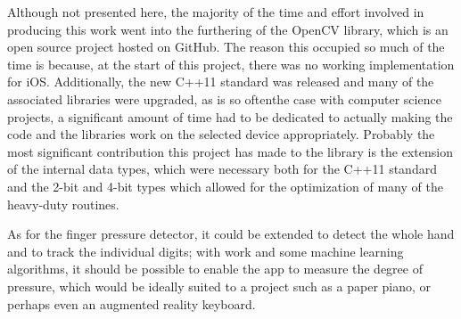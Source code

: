 Although not presented here, the majority of the time and effort involved in producing this work went into the furthering of the OpenCV library, which is an open source project hosted on GitHub. The reason this occupied so much of the time is because, at the start of this project, there was no working implementation for iOS. Additionally, the new C++11 standard was released and many of the associated libraries were upgraded, as is so oftenthe case with computer science projects, a significant amount of time had to be dedicated to actually making the code and the libraries work on the selected device appropriately. Probably the most significant contribution this project has made to the library is the extension of the internal data types, which were necessary both for the C++11 standard and the 2-bit and 4-bit types which allowed for the optimization of many of the heavy-duty routines.

As for the finger pressure detector, it could be extended to detect the whole hand and to track the individual digits; with work and some machine learning algorithms, it should be possible to enable the app to measure the degree of pressure, which would be ideally suited to a project such as a paper piano, or perhaps even an augmented reality keyboard.